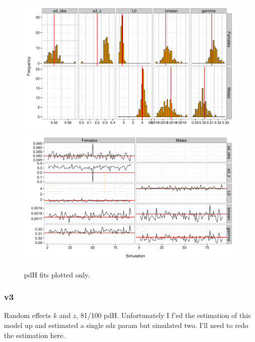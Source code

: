 \documentclass[11pt, a4paper]{article}
\begin{document}
\begin{figure}[!htbp]
  \centering
  \includegraphics[width=\linewidth]{../simulation/v2/results/SimPars.png}
  \includegraphics[width=\linewidth]{../simulation/v2/results/TracePars.png}
  \begin{quote}
    \caption{pdH fits plotted only.}
    \label{fig:sims1}
  \end{quote}
\end{figure}

\newpage\clearpage
\subsubsection{v3}
Random effects $k$ and $z$, 81/100 pdH. Unfortunately I f'ed the estimation of this
model up and estimated a single sdz param but simulated two. I'll need to redo
the estimation here.
\end{document}
